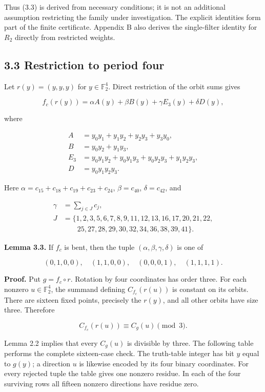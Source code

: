 \documentclass[pdflatex,sn-mathphys-num]{sn-jnl}
\begin{document}
Thus (3.3) is derived from necessary conditions; it is not an additional assumption restricting the family under investigation. The explicit identities form part of the finite certificate. Appendix B also derives the single-filter identity for $R_2$ directly from restricted weights.

\subsection*{3.3 Restriction to period four}

Let $r(y)=(y,y,y)$ for $y\in\mathbb F_2^4$. Direct restriction of the orbit sums gives

\[
f_c(r(y))=\alpha A(y)+\beta B(y)+\gamma E_3(y)+\delta D(y), \tag{3.4}
\]

where

\[
\begin{aligned}
A&=y_0y_1+y_1y_2+y_2y_3+y_3y_0,\\
B&=y_0y_2+y_1y_3,\\
E_3&=y_0y_1y_2+y_0y_1y_3+y_0y_2y_3+y_1y_2y_3,\\
D&=y_0y_1y_2y_3.
\end{aligned}
\]

Here $\alpha=c_{15}+c_{18}+c_{19}+c_{23}+c_{24}$, $\beta=c_{40}$, $\delta=c_{42}$, and

\[
\begin{aligned}\gamma&=\sum_{j\in J}c_j,\\J&=\{1,2,3,5,6,7,8,9,11,12,13,16,17,20,21,22,\\&\qquad25,27,28,29,30,32,34,36,38,39,41\}.\end{aligned} \tag{3.5}
\]

\textbf{Lemma 3.3.} If $f_c$ is bent, then the tuple $(\alpha,\beta,\gamma,\delta)$ is one of

\[
(0,1,0,0),\quad(1,1,0,0),\quad(0,0,0,1),\quad(1,1,1,1). \tag{3.6}
\]

\textbf{Proof.} Put $g=f_c\circ r$. Rotation by four coordinates has order three. For each nonzero $u\in\mathbb F_2^4$, the summand defining $C_{f_c}(r(u))$ is constant on its orbits. There are sixteen fixed points, precisely the $r(y)$, and all other orbits have size three. Therefore

\[
C_{f_c}(r(u))\equiv C_g(u)\pmod3. \tag{3.7}
\]

Lemma 2.2 implies that every $C_g(u)$ is divisible by three. The following table performs the complete sixteen-case check. The truth-table integer has bit $y$ equal to $g(y)$; a direction $u$ is likewise encoded by its four binary coordinates. For every rejected tuple the table gives one nonzero residue. In each of the four surviving rows all fifteen nonzero directions have residue zero.
\end{document}

